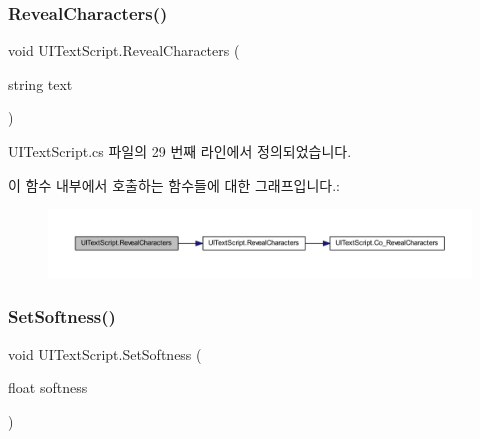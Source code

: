 \subsubsection{\texorpdfstring{RevealCharacters()}{RevealCharacters()}\hspace{0.1cm}{\footnotesize\ttfamily [2/2]}}
{\footnotesize\ttfamily void U\+I\+Text\+Script.\+Reveal\+Characters (\begin{DoxyParamCaption}\item[{string}]{text }\end{DoxyParamCaption})}



U\+I\+Text\+Script.\+cs 파일의 29 번째 라인에서 정의되었습니다.


\begin{DoxyCode}{0}

\end{DoxyCode}
이 함수 내부에서 호출하는 함수들에 대한 그래프입니다.\+:\nopagebreak
\begin{figure}[H]
\begin{center}
\leavevmode
\includegraphics[width=350pt]{da/d8d/class_u_i_text_script_a495e97bbed8219fa703953618f2948b8_cgraph}
\end{center}
\end{figure}
\mbox{\label{class_u_i_text_script_a5f00904260cbba5fb285ee9b9a04b1c2}} 
\subsubsection{\texorpdfstring{SetSoftness()}{SetSoftness()}}
{\footnotesize\ttfamily void U\+I\+Text\+Script.\+Set\+Softness (\begin{DoxyParamCaption}\item[{float}]{softness }\end{DoxyParamCaption})}



